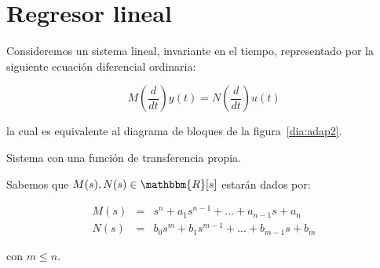     \section{Regresor lineal}

        Consideremos un sistema lineal, invariante en el tiempo, representado por la siguiente ecuación diferencial ordinaria:

        \begin{equation} \label{eq:adap1}
            M \left( \frac{d}{dt} \right) y(t) = N \left( \frac{d}{dt} \right) u(t)
        \end{equation}

        la cual es equivalente al diagrama de bloques de la figura~\ref{dia:adap2}.

        \begin{marginfigure}
            \centering
            \caption{\label{dia:adap2}Sistema con una función de transferencia propia.}
        \end{marginfigure}

        Sabemos que $M(s), N(s) \in \mathbbm{R}[s]$ estarán dados por:

        \begin{eqnarray} \label{eq:adap2}
            M(s) & = & s^n + a_1 s^{n-1} + \dots + a_{n-1} s + a_n \nonumber \\
            N(s) & = & b_0 s^m + b_1 s^{m-1} + \dots + b_{m-1} s + b_m
        \end{eqnarray}

        con $m \le n$.

